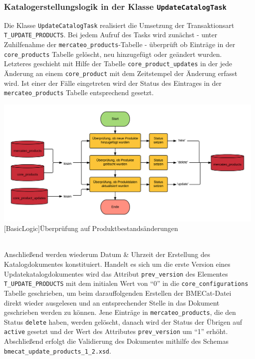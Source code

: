 	\subsubsection{Katalogerstellungslogik in der Klasse \texttt{UpdateCatalogTask} }
    Die	Klasse \texttt{UpdateCatalogTask} realisiert die Umsetzung der Transaktionsart
	\texttt{T\_UPDATE\_PRODUCTS}.
	Bei jedem  Aufruf des Tasks wird zunächst - unter Zuhilfenahme der \texttt{mercateo\_products}-Tabelle - überprüft ob Einträge in der \texttt{core\_products} Tabelle gelöscht, neu hinzugefügt oder geändert wurden. Letzteres geschieht mit Hilfe der Tabelle \texttt{core\_product\_updates} in der jede Änderung an einem \texttt{core\_product} mit dem Zeitstempel der Änderung erfasst wird. Ist einer der Fälle eingetreten wird der Status des Eintrages in der \texttt{mercateo\_products} Tabelle entsprechend gesetzt. \\
	\begin{minipage}{\linewidth}
		\vspace{1em}
		\centering
		\includegraphics[width=1 \linewidth]{img/productChangeCheck}
		[BasicLogic]{Überprüfung auf Produktbestandsänderungen}
		\vspace{1em}
	\end{minipage}\\
	
	
	Anschließend werden wiederum Datum \& Uhrzeit der Erstellung des Katalogdokumentes konstituiert.
	Handelt es sich um die erste Version eines Updatekatalogdokumentes wird das Attribut \texttt{prev\_version} des Elementes \texttt{T\_UPDATE\_PRODUCTS} mit dem initialen Wert von \enquote{0} in die \texttt{core\_configurations} Tabelle geschrieben, um beim darauffolgenden Erstellen der BMECat-Datei direkt wieder ausgelesen und an entsprechender Stelle in das Dokument geschrieben werden zu können.
	Jene Einträge in \texttt{mercateo\_products}, die den Status \texttt{delete} haben, werden gelöscht, danach wird der Status der Übrigen auf \texttt{active} gesetzt und  der Wert des Attributes \texttt{prev\_version} um \enquote{1} erhöht. Abschließend erfolgt die Validierung des Dokumentes mithilfe des Schemas \texttt{bmecat\_update\_products\_1\_2.xsd}.
	
